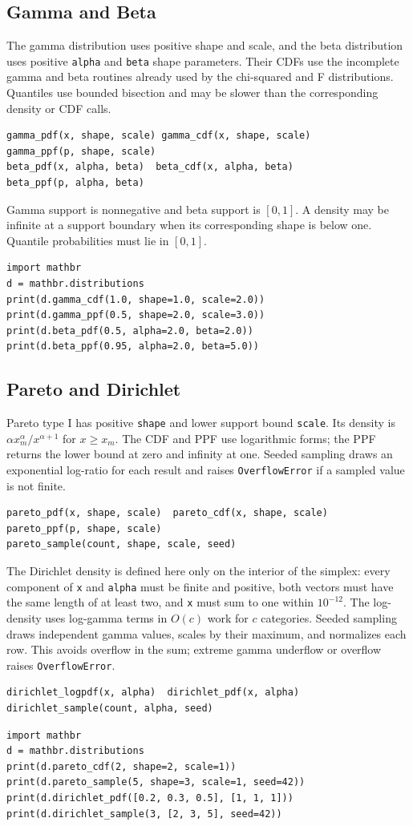 \documentclass[11pt,a4paper]{article}
\begin{document}
\subsection{Gamma and Beta}
The gamma distribution uses positive shape and scale, and the beta distribution uses positive \verb|alpha| and \verb|beta| shape parameters. Their CDFs use the incomplete gamma and beta routines already used by the chi-squared and F distributions. Quantiles use bounded bisection and may be slower than the corresponding density or CDF calls.
\begin{verbatim}
gamma_pdf(x, shape, scale) gamma_cdf(x, shape, scale)
gamma_ppf(p, shape, scale)
beta_pdf(x, alpha, beta)  beta_cdf(x, alpha, beta)
beta_ppf(p, alpha, beta)
\end{verbatim}
Gamma support is nonnegative and beta support is $[0,1]$. A density may be infinite at a support boundary when its corresponding shape is below one. Quantile probabilities must lie in $[0,1]$.
\begin{verbatim}
import mathbr
d = mathbr.distributions
print(d.gamma_cdf(1.0, shape=1.0, scale=2.0))
print(d.gamma_ppf(0.5, shape=2.0, scale=3.0))
print(d.beta_pdf(0.5, alpha=2.0, beta=2.0))
print(d.beta_ppf(0.95, alpha=2.0, beta=5.0))
\end{verbatim}

\subsection{Pareto and Dirichlet}
Pareto type I has positive \verb|shape| and lower support bound \verb|scale|. Its density is $\alpha x_m^\alpha/x^{\alpha+1}$ for $x\geq x_m$. The CDF and PPF use logarithmic forms; the PPF returns the lower bound at zero and infinity at one. Seeded sampling draws an exponential log-ratio for each result and raises \verb|OverflowError| if a sampled value is not finite.
\begin{verbatim}
pareto_pdf(x, shape, scale)  pareto_cdf(x, shape, scale)
pareto_ppf(p, shape, scale)
pareto_sample(count, shape, scale, seed)
\end{verbatim}
The Dirichlet density is defined here only on the interior of the simplex: every component of \verb|x| and \verb|alpha| must be finite and positive, both vectors must have the same length of at least two, and \verb|x| must sum to one within $10^{-12}$. The log-density uses log-gamma terms in $O(c)$ work for $c$ categories. Seeded sampling draws independent gamma values, scales by their maximum, and normalizes each row. This avoids overflow in the sum; extreme gamma underflow or overflow raises \verb|OverflowError|.
\begin{verbatim}
dirichlet_logpdf(x, alpha)  dirichlet_pdf(x, alpha)
dirichlet_sample(count, alpha, seed)
\end{verbatim}
\begin{verbatim}
import mathbr
d = mathbr.distributions
print(d.pareto_cdf(2, shape=2, scale=1))
print(d.pareto_sample(5, shape=3, scale=1, seed=42))
print(d.dirichlet_pdf([0.2, 0.3, 0.5], [1, 1, 1]))
print(d.dirichlet_sample(3, [2, 3, 5], seed=42))
\end{verbatim}
\end{document}
